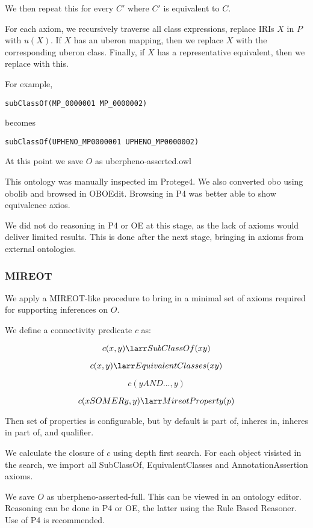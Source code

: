 We then repeat this for every $C'$ where $C'$ is equivalent to $C$.

For each axiom, we recursively traverse all class expressions, replace
IRIs $X$ in $P$ with $u(X)$. If $X$ has an uberon mapping,
then we replace $X$ with the corresponding uberon class. Finally,
if $X$ has a representative equivalent, then we replace with this.

For example,

\begin{verbatim}
subClassOf(MP_0000001 MP_0000002)
\end{verbatim}

becomes

\begin{verbatim}
subClassOf(UPHENO_MP0000001 UPHENO_MP0000002)
\end{verbatim}

At this point we save $O$ as uberpheno-asserted.owl

This ontology was manually inspected im Protege4. We also converted
obo using obolib and browsed in OBOEdit. Browsing in P4 was better
able to show equivalence axios.

We did not do reasoning in P4 or OE at this stage, as the lack of
axioms would deliver limited results. This is done after the next
stage, bringing in axioms from external ontologies.

\subsubsection{MIREOT}

We apply a MIREOT-like procedure to bring in a minimal set of axioms
required for supporting inferences on $O$.

We define a connectivity predicate $c$ as:

$$
c(x,y) \larr SubClassOf(x y)
$$

$$
c(x,y) \larr EquivalentClasses(x y)
$$

$$
c(y AND ...,y)
$$

$$
c(x SOME R y,y) \larr MireotProperty(p)
$$

Then set of properties is configurable, but by default is part of, inheres in, inheres in part of, and qualifier.

We calculate the closure of $c$ using depth first search. For each
object visisted in the search, we import all SubClassOf,
EquivalentClasses and AnnotationAssertion axioms.

We save $O$ as uberpheno-asserted-full. This can be viewed in an
ontology editor. Reasoning can be done in P4 or OE, the latter using
the Rule Based Reasoner. Use of P4 is recommended.


